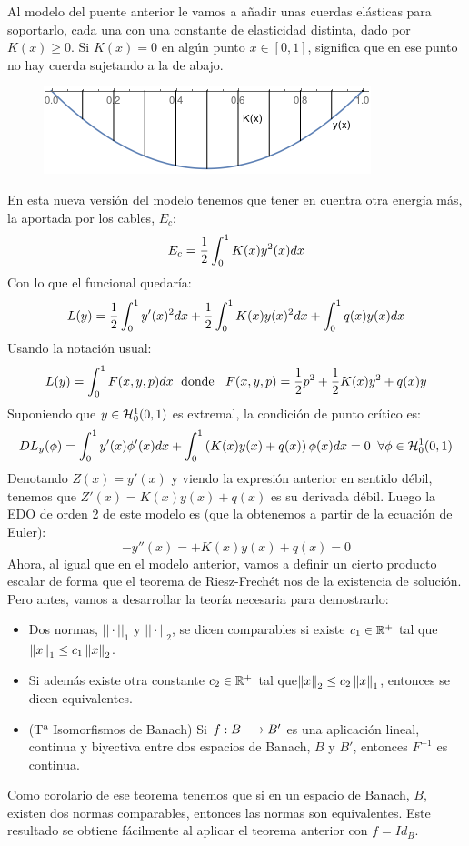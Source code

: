 Al modelo del puente anterior le vamos a añadir unas cuerdas elásticas para soportarlo, cada una con una constante de elasticidad distinta, dado por $K(x)\geq 0$.
Si $K(x)=0$ en algún punto $x\in[0,1]$, significa que en ese punto no hay cuerda sujetando a la de abajo.
\begin{figure}[H]
   \center
  \includegraphics[scale=0.6]{img/puentecuerdas.png}
\end{figure}
En esta nueva versión del modelo tenemos que tener en cuentra otra energía más, la aportada por los cables, $E_c$:
\[
E_c=\frac{1}{2}\integral{0}{1}{K(x)y^2(x)dx}
\]
Con lo que el funcional quedaría:
\[
L(y)=\frac{1}{2}\integral{0}{1}{y'(x)^2dx}+\frac{1}{2}\integral{0}{1}{K(x)y(x)^2dx}+\integral{0}{1}{q(x)y(x)dx}
\]
Usando la notación usual:
\begin{equation}\label{funcionalpuente}
L(y)=\integral{0}{1}{F(x,y,p)dx} \; \text{ donde } \;\; F(x,y,p)=\frac{1}{2}p^2+\frac{1}{2}K(x)y^2+q(x)y
\end{equation}
Suponiendo que $y\in\sobolevcero[0,1]{1}$ es extremal, la condición de punto crítico es:
\[
DL_y(\phi)=\integral{0}{1}{y'(x)\phi'(x)dx}+\integral{0}{1}{\left(K(x)y(x)+q(x)\right)\phi(x)dx}=0 \;\; \forall \phi\in\sobolevcero[0,1]{1}
\]
Denotando $Z(x)=y'(x)$ y viendo la expresión anterior en sentido débil, tenemos que $Z'(x)=K(x)y(x)+q(x)$ es su derivada débil. Luego la EDO de orden 2 de este modelo es (que la obtenemos a partir de la ecuación de Euler):
\[
-y''(x)=+K(x)y(x)+q(x)=0
\]
Ahora, al igual que en el modelo anterior, vamos a definir un cierto producto escalar de forma que el teorema de Riesz-Frechét nos de la existencia de solución. Pero antes, vamos a desarrollar la teoría necesaria para demostrarlo:

\begin{remark}
\begin{itemize}
\label{notafuncional}
\item Dos normas, $||\cdot||_1$ y $||\cdot||_2$, se dicen comparables si existe $c_1\in\R^+$ tal que $\norm{x}_1\leq c_1\norm{x}_2$.
\item Si además existe otra constante $c_2\in\R^+$ tal que$\norm{x}_2\leq c_2\norm{x}_1$, entonces se dicen equivalentes.
\item (Tª Isomorfismos de Banach) Si $\funcion{f}{B}{B'}$ es una aplicación lineal, continua y biyectiva entre dos espacios de Banach, $B$ y $B'$, entonces $F^{-1}$ es continua.
\end{itemize}

Como corolario de ese teorema tenemos que si en un espacio de Banach, $B$, existen dos normas comparables, entonces las normas son equivalentes. Este resultado se obtiene fácilmente al aplicar el teorema anterior con $f=Id_B$.
\end{remark}

